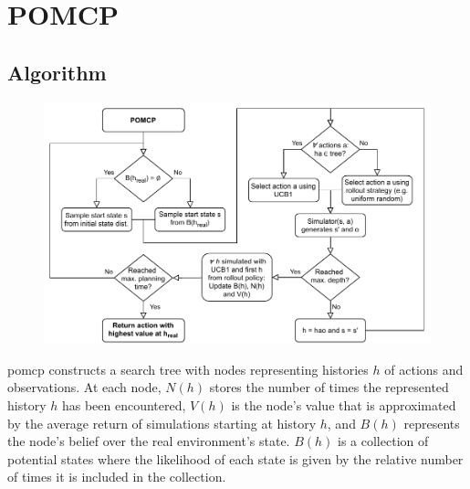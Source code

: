\chapter*{POMCP}
\setcounter{page}{1}
\label{sec:pomcp}


\section*{Algorithm}

\begin{figure}[h]
    \centering
    \includegraphics[width=\textwidth]{figures/POMCP.pdf}
\end{figure}

\Gls{pomcp} constructs a search tree with nodes representing histories $h$ of actions and observations. At each node, $N(h)$ stores the number of times the represented history $h$ has been encountered, $V(h)$ is the node's value that is approximated by the average return of simulations starting at history $h$, and $B(h)$ represents the node's belief over the real environment's state. $B(h)$ is a collection of potential states where the likelihood of each state is given by the relative number of times it is included in the collection.

